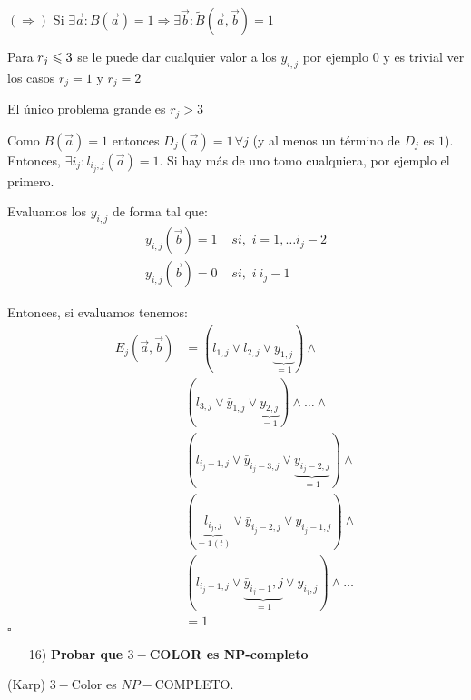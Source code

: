 \documentclass[12pt,a4paper]{article}
\begin{document}
$(\Rightarrow)$ Si $\exists \overrightarrow{a} : B(\overrightarrow{a}) = 1 \Rightarrow \exists \overrightarrow{b} : \widetilde{B}(\overrightarrow{a},\overrightarrow{b}) = 1$
\medskip

Para $r_{j} \leqslant 3$ se le puede dar cualquier valor a los $y_{i,j}$ por ejemplo $0$ 
y es trivial ver los casos $r_{j} = 1$ y $r_{j} = 2$
\medskip

El único problema grande es $r_{j} > 3$
\medskip

Como $B(\overrightarrow{a}) = 1$ entonces $D_{j}(\overrightarrow{a}) = 1\,\forall j$ 
(y al menos un término de $D_{j}$ es $1$). Entonces, 
$\exists i_{j} : l_{i_{j},j}(\overrightarrow{a}) = 1$.
Si hay más de uno tomo cualquiera, por ejemplo el primero.
\medskip

Evaluamos los $y_{i,j}$ de forma tal que:
\begin{align*}
    y_{i,j}(\overrightarrow{b}) = 1 &\,\, si,\,\, i = 1,\ldots i_{j}-2 \\
    y_{i,j}(\overrightarrow{b}) = 0 &\,\, si,\,\, i \> i_{j}-1
\end{align*}

Entonces, si evaluamos tenemos:
\begin{align*}
    E_{j}(\overrightarrow{a},\overrightarrow{b}) &= (l_{1,j} \vee l_{2,j} \vee \underbrace{y_{1,j}}_{=1}) \wedge \\
    & (l_{3,j} \vee \bar{y}_{1,j} \vee \underbrace{y_{2,j}}_{=1}) \wedge \ldots \wedge \\
    & (l_{i_{j}-1,j} \vee \bar{y}_{i_{j}-3,j} \vee \underbrace{y_{i_{j}-2,j}}_{=1}) \wedge \\
    & (\underbrace{l_{i_{j},j}}_{=1(t)} \vee \bar{y}_{i_{j}-2,j} \vee y_{i_{j}-1,j}) \wedge \\
    & (l_{i_{j}+1,j} \vee \underbrace{\bar{y}_{i_{j}-1},j}_{=1} \vee y_{i_{j},j}) \wedge \ldots \\
    &= 1
\end{align*}
$\square$

\begin{itemize}
    \item [16)] \textbf{Probar que $3-$COLOR es NP-completo}
    \label{dem:3color}
\end{itemize}

\begin{teorema} (Karp) $3-$Color es $NP-$COMPLETO.
\end{teorema}
\end{document}
